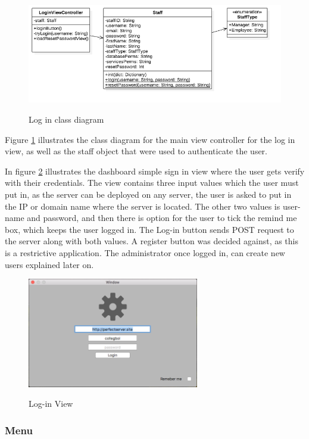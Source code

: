 \begin{figure}[!h]
    \caption{Log in class diagram}
    \centering
    \includegraphics[width=150mm]{images/classdiagrams/Login}
    \label{fig:login_cd}
\end{figure}

Figure \ref{fig:login_cd} illustrates the class diagram for the main view controller for the log in view, as well as the staff object that were used to authenticate the user. 

In figure \ref{fig:log-in-view} illustrates the dashboard simple sign in view where the user gets verify with their credentials. The view contains three input values which the user must put in, as the server can be deployed on any server, the user is asked to put in the IP or domain name where the server is located. The other two values is user-name and password, and then there is option for the user to tick the remind me box, which keeps the user logged in. The Log-in button sends POST request to the server along with both values. A register button was decided against, as this is a restrictive application. The administrator once logged in, can create new users explained later on.

\begin{figure}[!h]
    \caption{Log-in View}
    \centering
    \includegraphics[width=75mm]{images/dashboard/login}
    \label{fig:log-in-view}
\end{figure}

\newpage
\subsubsection{Menu}

